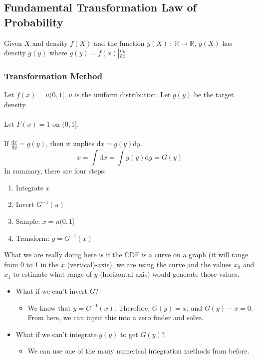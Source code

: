 \documentclass[10pt]{article}
\newcommand{\dd}{\text{d}}
\begin{document}
\subsection*{Fundamental Transformation Law of Probability}
Given $X$ and density $f(X)$ and the function $y(X) \::\: \mathbb{R} \rightarrow \mathbb{R}$, $y(X)$ has density $g(y)$ where $g(y) = f(x) \left|\frac{\dd y}{\dd x} \right|$

\subsubsection*{Transformation Method}
Let $f(x) = u(0, 1]$.  $u$ is the uniform distribution.  Let $g(y)$ be the target density.\\\\
Let $F(x) = 1$ on $(0, 1]$. \\\\
If $\frac{\dd x}{\dd y} = g(y)$, then it implies $\dd x = g(y) \dd y$.
\[x = \int \dd x = \int g(y) \dd y = G(y)\]
In summary, there are four steps:
\begin{enumerate}
	\item Integrate $x$
	\item Invert $G^{-1}(u)$
	\item Sample: $x = u(0, 1]$
	\item Transform: $y = G^{-1}(x)$
\end{enumerate}
What we are really doing here is if the CDF is a curve on a graph (it will range from 0 to 1 in the $x$ (vertical)-axis), we are using the curve and the values $x_0$ and $x_1$ to estimate what range of $y$ (horizontal axis) would generate those values.
\begin{itemize}
	\item What if we can't invert $G$?
	\begin{itemize}
        \item We know that $y = G^{-1}(x)$.  Therefore, $G(y) = x$, and $G(y) - x = 0$.  From here, we can input this into a zero finder and solve.
    \end{itemize}
    \item What if we can't integrate $g(y)$ to get $G(y)$?
    \begin{itemize}
	    \item We can use one of the many numerical integration methods from before.
    \end{itemize}
\end{itemize}
\end{document}
